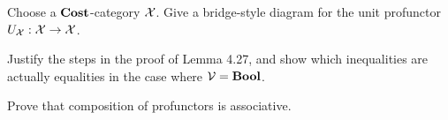 Choose a $\textbf{Cost}$-category $\mathcal{X}$.  Give a bridge-style diagram for the unit profunctor $U_{\mathcal{X}}:\mathcal{X}\to\mathcal{X}$.

\solution

Justify the steps in the proof of Lemma 4.27, and show which inequalities are actually equalities in the case where $\mathcal{V}=\textbf{Bool}$.

\solution

Prove that composition of profunctors is associative.

\solution






